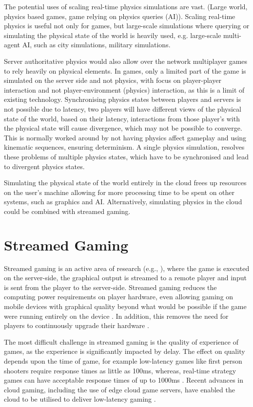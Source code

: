 The potential uses of scaling real-time physics simulations are vast. (Large world, physics based games, game relying on physics queries (AI)). Scaling real-time physics is useful not only for games, but large-scale simulations where querying or simulating the physical state of the world is heavily used, e.g. large-scale multi-agent AI, such as city simulations, military simulations. 

Server authoritative physics would also allow over the network multiplayer games to rely heavily on physical elements. In games, only a limited part of the game is simulated on the server side and not physics, with focus on player-player interaction and not player-environment (physics) interaction, as this is a limit of existing technology. 
Synchronising physics states between players and servers is not possible due to latency, two players will have different views of the physical state of the world, based on their latency, interactions from those player's with the physical state will cause divergence, which may not be possible to converge. This is normally worked around by not having physics affect gameplay and using kinematic sequences, ensuring determinism. A single physics simulation, resolves these problems of multiple physics states, which have to be synchronised and lead to divergent physics states. 

Simulating the physical state of the world entirely in the cloud frees up resources on the user's machine allowing for more processing time to be spent on other systems, such as graphics and AI. Alternatively, simulating physics in the cloud could be combined with streamed gaming.

\section{Streamed Gaming}
Streamed gaming is an active area of research (e.g., \cite{GARCIAVALLS}), where the game is executed on the server-side, the graphical output is streamed to a remote player and input is sent from the player to the server-side.
Streamed gaming reduces the computing power requirements on player hardware, even allowing gaming on mobile devices with graphical quality beyond what would be possible if the game were running entirely on the device \cite{CloudGamingArchPerf}. In addition, this removes the need for players to continuously upgrade their hardware \cite{LatencyoOfCloudGamingSystems}. 

The most difficult challenge in streamed gaming is the quality of experience of games, as the experience is significantly impacted by delay\cite{StormInCloudGaming}. The effect on quality depends upon the time of game, for example low-latency games like first person shooters require response times as little as 100ms, whereas, real-time strategy games can have acceptable response times of up to 1000ms \cite{CloudGamingArchPerf}. Recent advances in cloud gaming, including the use of edge cloud game servers, have enabled the cloud to be utilised to deliver low-latency gaming \cite{TimelyCloudGaming}.

